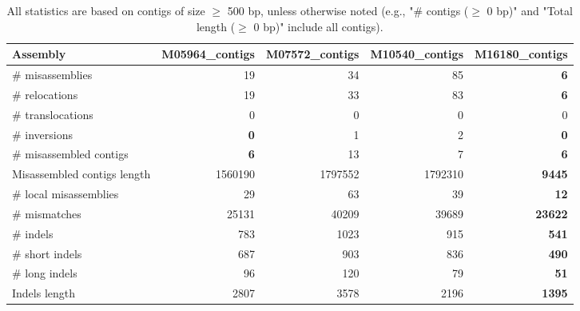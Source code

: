 \documentclass[12pt,a4paper]{article}
\begin{document}
\begin{table}[ht]
\begin{center}
\caption{All statistics are based on contigs of size $\geq$ 500 bp, unless otherwise noted (e.g., "\# contigs ($\geq$ 0 bp)" and "Total length ($\geq$ 0 bp)" include all contigs).}
\begin{tabular}{|l*{4}{|r}|}
\hline
Assembly & M05964\_contigs & M07572\_contigs & M10540\_contigs & M16180\_contigs \\ \hline
\# misassemblies & 19 & 34 & 85 & {\bf 6} \\ \hline
\hspace{5mm}\# relocations & 19 & 33 & 83 & {\bf 6} \\ \hline
\hspace{5mm}\# translocations & 0 & 0 & 0 & 0 \\ \hline
\hspace{5mm}\# inversions & {\bf 0} & 1 & 2 & {\bf 0} \\ \hline
\# misassembled contigs & {\bf 6} & 13 & 7 & {\bf 6} \\ \hline
Misassembled contigs length & 1560190 & 1797552 & 1792310 & {\bf 9445} \\ \hline
\# local misassemblies & 29 & 63 & 39 & {\bf 12} \\ \hline
\# mismatches & 25131 & 40209 & 39689 & {\bf 23622} \\ \hline
\# indels & 783 & 1023 & 915 & {\bf 541} \\ \hline
\hspace{5mm}\# short indels & 687 & 903 & 836 & {\bf 490} \\ \hline
\hspace{5mm}\# long indels & 96 & 120 & 79 & {\bf 51} \\ \hline
Indels length & 2807 & 3578 & 2196 & {\bf 1395} \\ \hline
\end{tabular}
\end{center}
\end{table}
\end{document}
